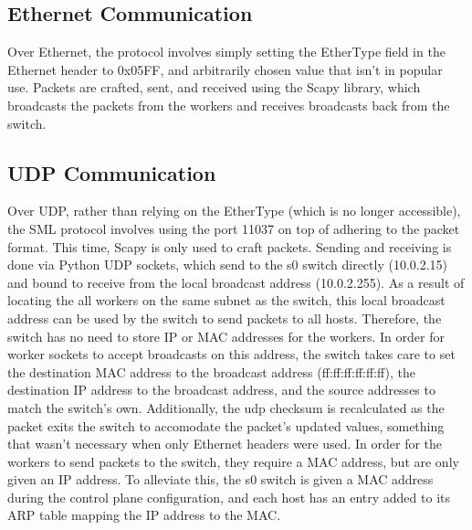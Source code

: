 \documentclass[a4paper,11pt]{article}
\begin{document}
\subsection{Ethernet Communication}

Over Ethernet, the protocol involves simply setting the EtherType field in the Ethernet header to 0x05FF, and arbitrarily chosen value that isn't in popular use. Packets are crafted, sent, and received using the Scapy library, which broadcasts the packets from the workers and receives broadcasts back from the switch.

\subsection{UDP Communication}
Over UDP, rather than relying on the EtherType (which is no longer accessible), the SML protocol involves using the port 11037 on top of adhering to the packet format. This time, Scapy is only used to craft packets. Sending and receiving is done via Python UDP sockets, which send to the s0 switch directly (10.0.2.15) and bound to receive from the local broadcast address (10.0.2.255).\newline
As a result of locating the all workers on the same subnet as the switch, this local broadcast address can be used by the switch to send packets to all hosts. Therefore, the switch has no need to store IP or MAC addresses for the workers.\newline
In order for worker sockets to accept broadcasts on this address, the switch takes care to set the destination MAC address to the broadcast address (ff:ff:ff:ff:ff:ff), the destination IP address to the broadcast address, and the source addresses to match the switch's own. Additionally, the udp checksum is recalculated as the packet exits the switch to accomodate the packet's updated values, something that wasn't necessary when only Ethernet headers were used.\newline
In order for the workers to send packets to the switch, they require a MAC address, but are only given an IP address. To alleviate this, the s0 switch is given a MAC address during the control plane configuration, and each host has an entry added to its ARP table mapping the IP address to the MAC.
\end{document}
